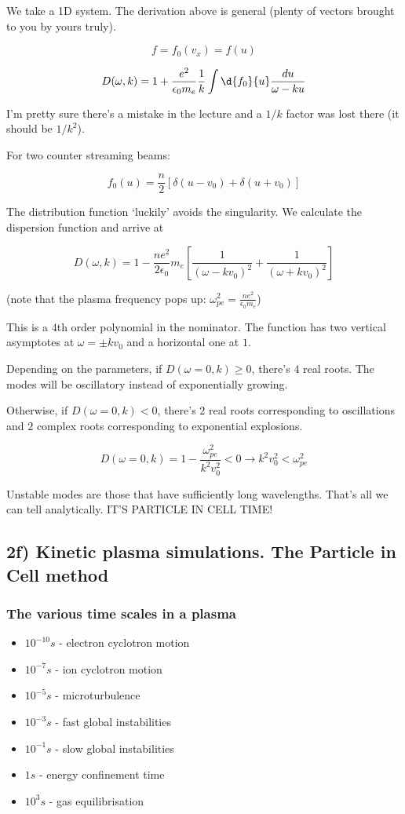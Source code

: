 \documentclass[PlasmaNotes.tex]{subfiles}
\begin{document}
We take a 1D system. The derivation above is general (plenty of vectors brought to you by yours truly). 

\[f=f_0(v_x) = f(u)\]

\[ D(\omega, k) = 1 + \frac{e^2}{\epsilon_0 m_e} \frac{1}{k} \int \d{f_0}{u} \frac{du}{\omega-k u} \]

I'm pretty sure there's a mistake in the lecture and a $1/k$ factor was lost there (it should be $1/k^2$).

For two counter streaming beams:

\[ f_0 (u) =\frac{n}{2} [\delta(u-v_0) + \delta(u+v_0)] \]

The distribution function `luckily' avoids the singularity. We calculate the dispersion function and arrive at

\[D(\omega, k) = 1- \frac{n e^2}{2 \epsilon_0}{m_e} [\frac{1}{(\omega-k v_0)^2} + \frac{1}{(\omega + k v_0)^2} ] \]

(note that the plasma frequency pops up: $\omega^2_{pe} = \frac{n e^2}{\epsilon_0 m_e}$)

This is a $4$th order polynomial in the nominator. The function has two vertical asymptotes at $\omega = \pm k v_0$ and a horizontal one at $1$.

Depending on the parameters, if $D(\omega=0, k) \geq 0$, there's $4$ real roots. The modes will be oscillatory instead of exponentially growing.

Otherwise, if $D(\omega = 0, k) < 0$, there's $2$ real roots corresponding to oscillations and $2$ complex roots corresponding to exponential explosions.

\[ D(\omega =0, k) = 1 - \frac{\omega_{pe}^2}{k^2 v_0^2} < 0 \rightarrow k^2 v_0^2 < \omega_{pe}^2 \]

Unstable modes are those that have sufficiently long wavelengths. That's all we can tell analytically. IT'S PARTICLE IN CELL TIME!

\subsection{2f) Kinetic plasma simulations. The Particle in Cell method}
\subsubsection{The various time scales in a plasma}

\begin{itemize}
\item $10^{-10}s$ - electron cyclotron motion
\item $10^{-7}s$ - ion cyclotron motion
\item $10^{-5}s$ - microturbulence
\item $10^{-3}s$ - fast global instabilities
\item $10^{-1}s$ - slow global instabilities
\item $1s$ - energy confinement time
\item $10^3s$ - gas equilibrisation
\end{itemize}
\end{document}
